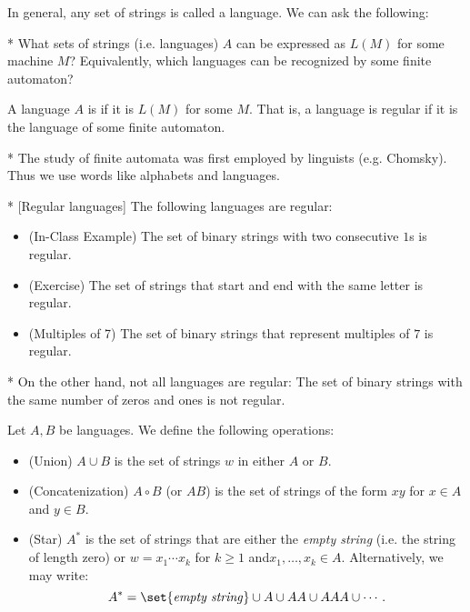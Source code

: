 In general, any set of strings is called a language. We can ask the following:

\begin{que}*
	What sets of strings (i.e. languages) $A$ can be expressed as $L(M)$ for some machine $M$? Equivalently, which languages can be recognized by some finite automaton?
\end{que}

\begin{defn}
	A language $A$ is  if it is $L(M)$ for some $M$. That is, a language is regular if it is the language of some finite automaton.
\end{defn}

\begin{fact}*
	The study of finite automata was first employed by linguists (e.g. Chomsky). Thus we use words like alphabets and languages.
\end{fact}

\begin{exm}*
	[Regular languages]
	The following languages are regular:
	\begin{itemize}
		\item (In-Class Example) The set of binary strings with two consecutive $1$s is regular.
		\item (Exercise) The set of strings that start and end with the same letter is regular.
		\item (Multiples of 7) The set of binary strings that represent multiples of $7$ is regular.
	\end{itemize}
\end{exm}

\begin{exm}*
	On the other hand, not all languages are regular: The set of binary strings with the same number of zeros and ones is not regular. 
\end{exm}

\begin{defn}
	Let $A,B$ be languages. We define the following operations:
	\begin{itemize}
		\item (Union) $A\cup B$ is the set of strings $w$ in either $A$ or $B$.
		\item (Concatenization) $A\circ B$ (or $AB$) is the set of strings of the form $xy$ for $x\in A$ and $y\in B$. 
		\item (Star) $A^*$ is the set of strings that are either the \emph{empty string} (i.e. the string of length zero) or $w = x_1\cdots x_k$ for $k\geq 1$ and$x_1, \ldots, x_k\in A$. Alternatively, we may write: \[
				A^* = \set{\text{\emph{empty string}}} \cup A \cup AA \cup AAA \cup \cdots.
			\]
	\end{itemize}
\end{defn}

